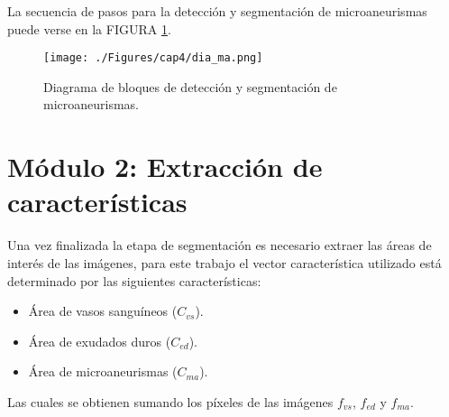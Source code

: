 La secuencia de pasos para la detección y segmentación de microaneurismas puede verse en la FIGURA \ref{fig:diaMa}.

\begin{figure}[H]
	\centering
		\texttt{[image: ./Figures/cap4/dia\_ma.png]}
	\caption{Diagrama de bloques de detección y segmentación de microaneurismas.}
	\label{fig:diaMa}
\end{figure}



\section{Módulo 2: Extracción de características}
Una vez finalizada la etapa de segmentación es necesario extraer las áreas de interés de las imágenes, para este trabajo el vector característica utilizado está determinado por las siguientes características:
\begin{itemize}
\item Área de vasos sanguíneos ($C_{vs}$).
\item Área de exudados duros ($C_{ed}$).
\item Área de microaneurismas ($C_{ma}$).
\end{itemize}


Las cuales se obtienen sumando los píxeles de las imágenes $f_{vs}$, $f_{ed}$ y $f_{ma}$.



